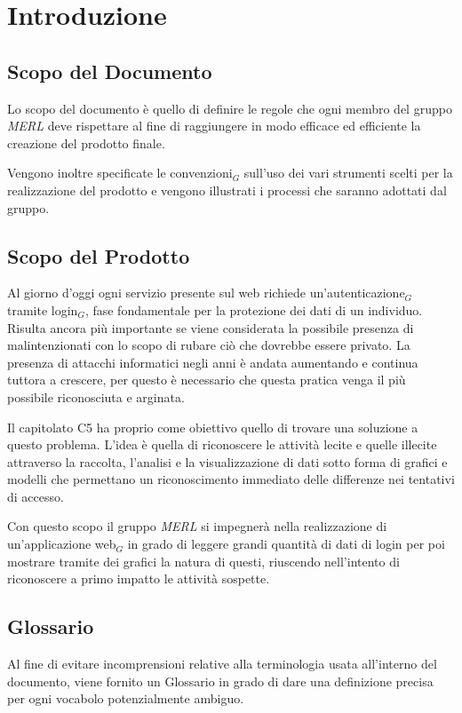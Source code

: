 \chapter{Introduzione}

\section{Scopo del Documento}
Lo scopo del documento è quello di definire le regole che ogni membro del gruppo \textit{MERL} deve rispettare al fine di raggiungere in modo efficace ed efficiente la creazione del prodotto finale.

Vengono inoltre specificate le convenzioni$_G$ sull'uso dei vari strumenti scelti per la realizzazione del prodotto e vengono illustrati i processi che saranno adottati dal gruppo.

\section{Scopo del Prodotto}
Al giorno d'oggi ogni servizio presente sul web richiede un'autenticazione$_G$ tramite login$_G$, fase fondamentale per la protezione dei dati di un individuo. Risulta ancora più importante se viene considerata la possibile presenza di malintenzionati con lo scopo di rubare ciò che dovrebbe essere privato. La presenza di attacchi informatici negli anni è andata aumentando e continua tuttora a crescere, per questo è necessario che questa pratica venga il più possibile riconosciuta e arginata.

Il capitolato C5 ha proprio come obiettivo quello di trovare una soluzione a questo problema. L'idea è quella di riconoscere le attività lecite e quelle illecite attraverso la raccolta, l'analisi e la visualizzazione di dati sotto forma di grafici e modelli che permettano un riconoscimento immediato delle differenze nei tentativi di accesso.

Con questo scopo il gruppo \textit{MERL} si impegnerà nella realizzazione di un'applicazione web$_G$ in grado di leggere grandi quantità di dati di login per poi mostrare tramite dei grafici la natura di questi, riuscendo nell'intento di riconoscere a primo impatto le attività sospette.

\section{Glossario}
Al fine di evitare incomprensioni relative alla terminologia usata all'interno del documento, viene fornito un Glossario in grado di dare una definizione precisa per ogni vocabolo potenzialmente ambiguo.

